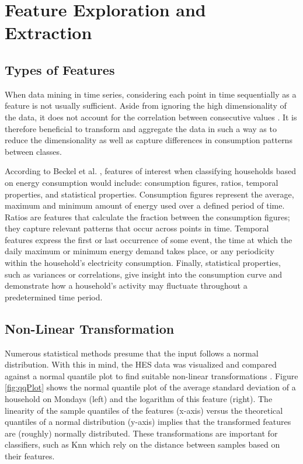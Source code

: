 \chapter{Feature Exploration and Extraction}
\label{ch:Features}

\section{Types of Features}
When data mining in time series, considering each point in time sequentially as a feature is not usually sufficient. Aside from ignoring the high dimensionality of the data, it does not account for the correlation between consecutive values \cite{Moerchen}. It is therefore beneficial to transform and aggregate the data in such a way as to reduce the dimensionality as well as capture differences in consumption patterns between classes. 

According to Beckel et al. \cite{Beckel_2}, features of interest when classifying households based on energy consumption would include: consumption figures, ratios, temporal properties, and statistical properties. Consumption figures represent the average, maximum and minimum amount of energy used over a defined period of time. Ratios are features that calculate the fraction between the consumption figures; they capture relevant patterns that occur across points in time. Temporal features express the first or last occurrence of some event, the time at which the daily maximum or minimum energy demand takes place, or any periodicity within the household's electricity consumption. Finally, statistical properties, such as variances or correlations, give insight into the consumption curve and demonstrate how a household's activity may fluctuate throughout a predetermined time period.

\section{Non-Linear Transformation}
Numerous statistical methods presume that the input follows a normal distribution. With this in mind, the HES data was visualized and compared against a normal quantile plot to find suitable non-linear transformations \cite{Osborne} \cite{Wang}. Figure \ref{fig:qqPlot} shows the normal quantile plot of the average standard deviation of a household on Mondays (left) and the logarithm of this feature (right). The linearity of the sample quantiles of the features (x-axis) versus the theoretical quantiles of a normal distribution (y-axis) implies that the transformed features are (roughly) normally distributed. These transformations are important for classifiers, such as Knn which rely on the distance between samples based on their features.


